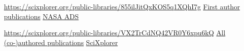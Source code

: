 


\begin{cventries}

  \cventry
    {\href{https://scixplorer.org/public-libraries/855ilJitQxKOS5q1XQhI7g}{https://scixplorer.org/public-libraries/855ilJitQxKOS5q1XQhI7g}} %
    {\href{https://scixplorer.org/public-libraries/855ilJitQxKOS5q1XQhI7g}{First author publications}} %
    {\href{https://scixplorer.org/public-libraries/855ilJitQxKOS5q1XQhI7g}{NASA ADS}} %
    {} %
    {}

  \cventry
    {\href{https://scixplorer.org/public-libraries/VX2TrCdNQ42VR0Y6xpu6kQ}{https://scixplorer.org/public-libraries/VX2TrCdNQ42VR0Y6xpu6kQ}} %
    {\href{https://scixplorer.org/public-libraries/VX2TrCdNQ42VR0Y6xpu6kQ}{All (co-)authored publications}} %
    {\href{https://scixplorer.org/public-libraries/VX2TrCdNQ42VR0Y6xpu6kQ}{SciXplorer}} %
    {} %
    {}



\end{cventries}


\setcounter{publication}{6} %

